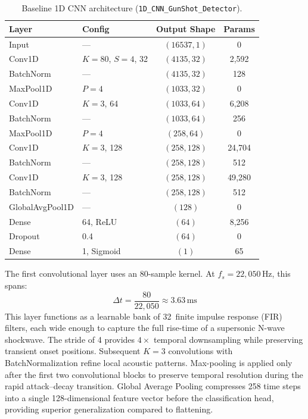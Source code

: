 \documentclass[conference]{IEEEtran}
\begin{document}
\begin{table}[!t]
\centering
\caption{Baseline 1D CNN architecture (\texttt{1D\_CNN\_GunShot\_Detector}).}
\label{tab:arch_1d}
\footnotesize
\begin{tabular}{llcc}
\toprule
\textbf{Layer} & \textbf{Config} & \textbf{Output Shape} & \textbf{Params} \\
\midrule
Input & --- & $(16537, 1)$ & 0 \\
Conv1D & $K\!=\!80$, $S\!=\!4$, 32 & $(4135, 32)$ & 2{,}592 \\
BatchNorm & --- & $(4135, 32)$ & 128 \\
MaxPool1D & $P\!=\!4$ & $(1033, 32)$ & 0 \\
Conv1D & $K\!=\!3$, 64 & $(1033, 64)$ & 6{,}208 \\
BatchNorm & --- & $(1033, 64)$ & 256 \\
MaxPool1D & $P\!=\!4$ & $(258, 64)$ & 0 \\
Conv1D & $K\!=\!3$, 128 & $(258, 128)$ & 24{,}704 \\
BatchNorm & --- & $(258, 128)$ & 512 \\
Conv1D & $K\!=\!3$, 128 & $(258, 128)$ & 49{,}280 \\
BatchNorm & --- & $(258, 128)$ & 512 \\
GlobalAvgPool1D & --- & $(128)$ & 0 \\
Dense & 64, ReLU & $(64)$ & 8{,}256 \\
Dropout & 0.4 & $(64)$ & 0 \\
Dense & 1, Sigmoid & $(1)$ & 65 \\
\bottomrule
\end{tabular}
\end{table}

The first convolutional layer uses an 80-sample kernel. At $f_s = 22{,}050\,\text{Hz}$, this spans:
\begin{equation}
    \Delta t = \frac{80}{22{,}050} \approx 3.63\,\text{ms}
    \label{eq:kernel_duration}
\end{equation}
This layer functions as a learnable bank of 32~finite impulse response (FIR) filters, each wide enough to capture the full rise-time of a supersonic N-wave shockwave. The stride of 4 provides $4\times$ temporal downsampling while preserving transient onset positions. Subsequent $K\!=\!3$ convolutions with BatchNormalization refine local acoustic patterns. Max-pooling is applied only after the first two convolutional blocks to preserve temporal resolution during the rapid attack--decay transition. Global Average Pooling compresses 258 time steps into a single 128-dimensional feature vector before the classification head, providing superior generalization compared to flattening.
\end{document}

